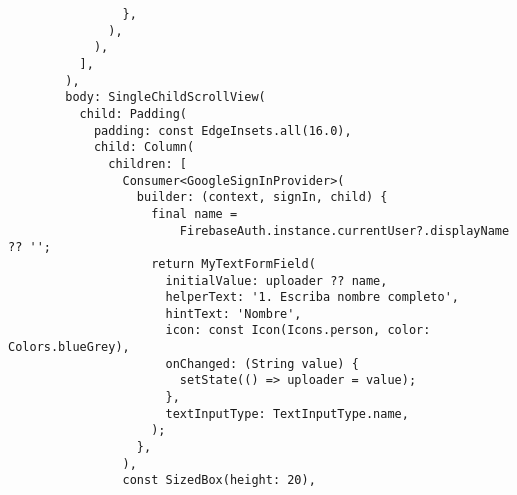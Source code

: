 \begin{verbatim}
                },
              ),
            ),
          ],
        ),
        body: SingleChildScrollView(
          child: Padding(
            padding: const EdgeInsets.all(16.0),
            child: Column(
              children: [
                Consumer<GoogleSignInProvider>(
                  builder: (context, signIn, child) {
                    final name =
                        FirebaseAuth.instance.currentUser?.displayName ?? '';
                    return MyTextFormField(
                      initialValue: uploader ?? name,
                      helperText: '1. Escriba nombre completo',
                      hintText: 'Nombre',
                      icon: const Icon(Icons.person, color: Colors.blueGrey),
                      onChanged: (String value) {
                        setState(() => uploader = value);
                      },
                      textInputType: TextInputType.name,
                    );
                  },
                ),
                const SizedBox(height: 20),


\end{verbatim}
